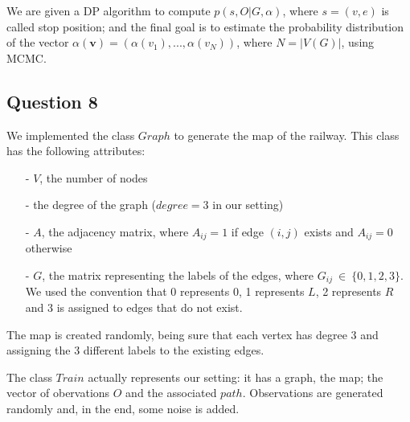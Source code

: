 \documentclass[]{article}
\begin{document}
	We are given a DP algorithm to compute $p(s,O|G,\alpha)$, where $s=(v,e)$ is called stop position; and the final goal is to estimate the probability distribution of the vector $\alpha(\mathbf{v}) = (\alpha(v_1), ..., \alpha(v_N))$,  where $ N=|V(G)| $, using MCMC.
	
	\subsection*{Question 8}
	We implemented the class $Graph$ to generate the map of the railway. This class has the following attributes:
	\begin{enumerate}
		\item[-] $V$, the number of nodes 
		\item[-] the degree of the graph ($degree=3$ in our setting) 
		\item[-] $A$, the adjacency matrix, where $A_{ij}=1$ if edge $(i,j)$ exists and $A_{ij}=0$ otherwise
		\item[-] $G$, the matrix representing the labels of the edges, where $G_{ij} \ \in \ \{ 0,1,2,3\} $. We used the convention that 0 represents 0, 1 represents $L$, 2 represents $R$ and 3 is assigned to edges that do not exist.
	\end{enumerate} 
	The map is created randomly, being sure that each vertex has degree 3 and assigning the 3 different labels to the existing edges.
	
	The class $Train$ actually represents our setting: it has a graph, the map; the vector of obervations $O$ and the associated $path$. Observations are generated randomly and, in the end, some noise is added.
	
\end{document}
